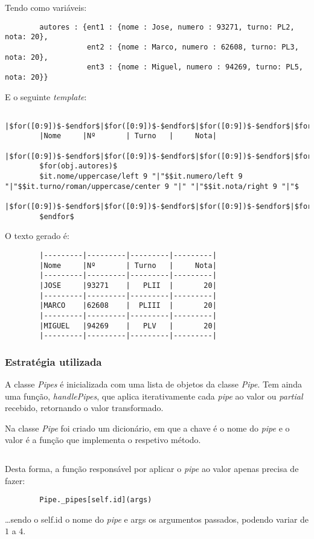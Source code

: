 \documentclass[../relatorio.tex]{subfiles}
\begin{document}
    Tendo como variáveis:
    \begin{verbatim}
        autores : {ent1 : {nome : Jose, numero : 93271, turno: PL2, nota: 20}, 
                   ent2 : {nome : Marco, numero : 62608, turno: PL3, nota: 20},
                   ent3 : {nome : Miguel, numero : 94269, turno: PL5, nota: 20}}
    \end{verbatim}
    E o seguinte \textit{template}:
    \begin{verbatim}
        |$for([0:9])$-$endfor$|$for([0:9])$-$endfor$|$for([0:9])$-$endfor$|$for([0:9])$-$endfor$|
        |Nome     |Nº       | Turno   |     Nota|
        |$for([0:9])$-$endfor$|$for([0:9])$-$endfor$|$for([0:9])$-$endfor$|$for([0:9])$-$endfor$|
        $for(obj.autores)$
        $it.nome/uppercase/left 9 "|"$$it.numero/left 9 "|"$$it.turno/roman/uppercase/center 9 "|" "|"$$it.nota/right 9 "|"$
        |$for([0:9])$-$endfor$|$for([0:9])$-$endfor$|$for([0:9])$-$endfor$|$for([0:9])$-$endfor$|
        $endfor$
    \end{verbatim}
    O texto gerado é:
    \begin{verbatim}
        |---------|---------|---------|---------|
        |Nome     |Nº       | Turno   |     Nota|
        |---------|---------|---------|---------|
        |JOSE     |93271    |   PLII  |       20|
        |---------|---------|---------|---------|
        |MARCO    |62608    |  PLIII  |       20|
        |---------|---------|---------|---------|
        |MIGUEL   |94269    |   PLV   |       20|
        |---------|---------|---------|---------|
    \end{verbatim}

    \subsubsection{Estratégia utilizada}

    A classe \textit{Pipes} é inicializada com uma lista de objetos da classe 
    \textit{Pipe}. Tem ainda uma função, \textit{handlePipes}, que aplica iterativamente
    cada \textit{pipe} ao valor ou \textit{partial} recebido, retornando o valor transformado.

    Na classe \textit{Pipe} foi criado um dicionário, em que a chave é o nome do \textit{pipe} 
    e o valor é a função que implementa o respetivo método. 
    
    \inputminted[firstline=214, lastline=231]{py}{../modules/Pipe.py}
    
    Desta forma, a função responsável por aplicar o \textit{pipe} ao valor apenas precisa
    de fazer:
    \begin{verbatim}
        Pipe._pipes[self.id](args)
    \end{verbatim}
    \dots sendo o self.id o nome do \textit{pipe} e args os argumentos passados, podendo variar de
    $1$ a $4$. 
\end{document}
